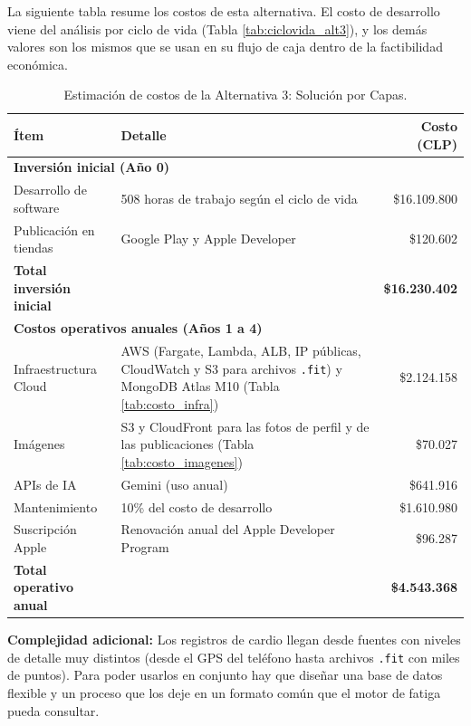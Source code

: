 La siguiente tabla resume los costos de esta alternativa. El costo de desarrollo viene del análisis por ciclo de vida (Tabla \ref{tab:ciclovida_alt3}), y los demás valores son los mismos que se usan en su flujo de caja dentro de la factibilidad económica.

\begin{table}[h!]
    \centering
    \renewcommand{\arraystretch}{1.4}
    \begin{tabular}{|m{4cm}|m{5.5cm}|r|}
        \hline
        \rowcolor[HTML]{EFEFEF}
        \textbf{Ítem} & \textbf{Detalle} & \textbf{Costo (CLP)} \\ \hline
        \multicolumn{3}{|l|}{\cellcolor[HTML]{E3F2FD}\textbf{Inversión inicial (Año 0)}} \\ \hline
        Desarrollo de software & 508 horas de trabajo según el ciclo de vida & \$16.109.800 \\ \hline
        Publicación en tiendas & Google Play y Apple Developer & \$120.602 \\ \hline
        \rowcolor[HTML]{E8F5E9}
        \textbf{Total inversión inicial} & & \textbf{\$16.230.402} \\ \hline
        \multicolumn{3}{|l|}{\cellcolor[HTML]{FFF3E0}\textbf{Costos operativos anuales (Años 1 a 4)}} \\ \hline
        Infraestructura Cloud & AWS (Fargate, Lambda, ALB, IP públicas, CloudWatch y S3 para archivos \texttt{.fit}) y MongoDB Atlas M10 (Tabla \ref{tab:costo_infra}) & \$2.124.158 \\ \hline
        Imágenes & S3 y CloudFront para las fotos de perfil y de las publicaciones (Tabla \ref{tab:costo_imagenes}) & \$70.027 \\ \hline
        APIs de IA & Gemini (uso anual) & \$641.916 \\ \hline
        Mantenimiento & 10\% del costo de desarrollo & \$1.610.980 \\ \hline
        Suscripción Apple & Renovación anual del Apple Developer Program & \$96.287 \\ \hline
        \rowcolor[HTML]{FFF3E0}
        \textbf{Total operativo anual} & & \textbf{\$4.543.368} \\ \hline
    \end{tabular}
    \caption{Estimación de costos de la Alternativa 3: Solución por Capas.}
    \label{tab:costos_alt3}
\end{table}

\textbf{Complejidad adicional:} Los registros de cardio llegan desde fuentes con niveles de detalle muy distintos (desde el GPS del teléfono hasta archivos \texttt{.fit} con miles de puntos). Para poder usarlos en conjunto hay que diseñar una base de datos flexible y un proceso que los deje en un formato común que el motor de fatiga pueda consultar.

